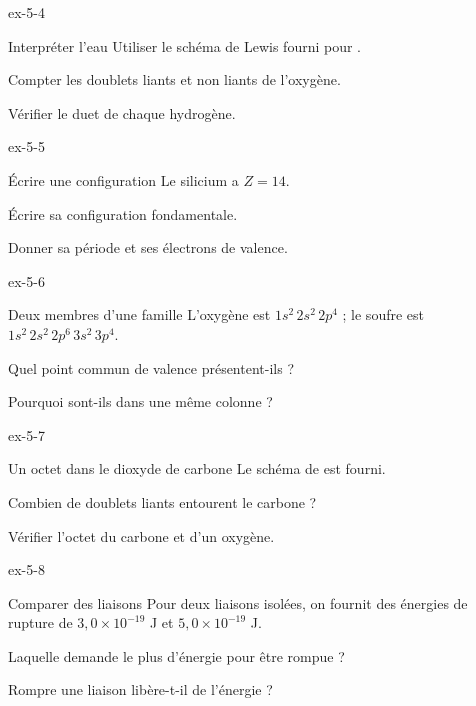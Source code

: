 \begin{blocLivre}{ex-5-4}\begin{exercice}[1]{Interpréter l’eau}
Utiliser le schéma de Lewis fourni pour .
\begin{questions}
\item Compter les doublets liants et non liants de l’oxygène.
\item Vérifier le duet de chaque hydrogène.
\end{questions}
\end{exercice}\end{blocLivre}
\begin{blocLivre}{ex-5-5}\begin{exercice}[2]{Écrire une configuration}
Le silicium a $Z=14$.
\begin{questions}
\item Écrire sa configuration fondamentale.
\item Donner sa période et ses électrons de valence.
\end{questions}
\end{exercice}\end{blocLivre}
\begin{blocLivre}{ex-5-6}\begin{exercice}[2]{Deux membres d’une famille}
L’oxygène est $1s^2\,2s^2\,2p^4$ ; le soufre est $1s^2\,2s^2\,2p^6\,3s^2\,3p^4$.
\begin{questions}
\item Quel point commun de valence présentent-ils ?
\item Pourquoi sont-ils dans une même colonne ?
\end{questions}
\end{exercice}\end{blocLivre}
\begin{blocLivre}{ex-5-7}\begin{exercice}[2]{Un octet dans le dioxyde de carbone}
Le schéma de  est fourni.
\begin{questions}
\item Combien de doublets liants entourent le carbone ?
\item Vérifier l’octet du carbone et d’un oxygène.
\end{questions}
\end{exercice}\end{blocLivre}
\begin{blocLivre}{ex-5-8}\begin{exercice}[2]{Comparer des liaisons}
Pour deux liaisons isolées, on fournit des énergies de rupture de $3,0\times10^{-19}$ J et $5,0\times10^{-19}$ J.
\begin{questions}
\item Laquelle demande le plus d’énergie pour être rompue ?
\item Rompre une liaison libère-t-il de l’énergie ?
\end{questions}
\end{exercice}\end{blocLivre}
